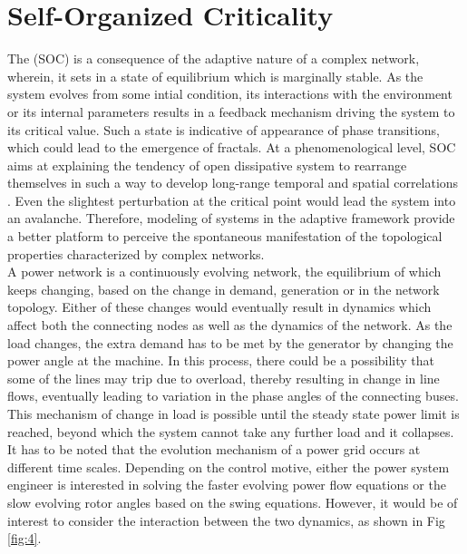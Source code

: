\documentclass{ifacconf}
\begin{document}
\section{Self-Organized Criticality} 
The (SOC) is a consequence of the adaptive nature of a complex network, wherein, it sets in a state of equilibrium which is marginally stable. As the system evolves from some intial condition, its interactions with the environment or its internal parameters results in a feedback mechanism driving the system to its critical value. 
Such a state is indicative of appearance of phase transitions, which could lead to the emergence of fractals. At a phenomenological level, SOC aims at explaining the tendency of open dissipative system to rearrange themselves in such a way to develop long-range temporal and spatial correlations \citep{Mei}. Even the slightest perturbation at the critical point would lead the system into an avalanche. Therefore, modeling of systems in the adaptive framework provide a better platform to perceive the spontaneous manifestation of the topological properties characterized by complex networks.\\
A power network is a continuously evolving network, the equilibrium of which keeps changing, based on the change in demand, generation or in the network topology. Either of these changes would eventually result in dynamics which affect both the connecting nodes as well as the dynamics of the network. As the load changes, the extra demand has to be met by the generator by changing the power angle at the machine. In this process, there could be a possibility that some of the lines may trip due to overload, thereby resulting in change in line flows, eventually leading to variation in the phase angles of the connecting buses. This mechanism of change in load is possible until the steady state power limit is reached, beyond which the system cannot take any further load and it collapses. \\
It has to be noted that the evolution mechanism of a power grid occurs at different time scales. Depending on the control motive, either the power system engineer is interested in solving the faster evolving power flow equations or the slow evolving rotor angles based on the swing equations. However, it would be of interest to consider the interaction between the two dynamics, as shown in Fig \ref{fig:4}.
\end{document}
